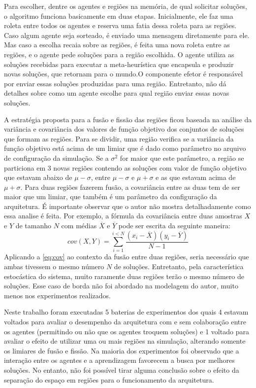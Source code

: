 Para escolher, dentre os agentes e regiões na memória, de qual solicitar soluções, o algoritmo funciona basicamente em duas etapas. Inicialmente, ele faz uma roleta entre todos os agentes e reserva uma fatia dessa roleta para as regiões. Caso algum agente seja sorteado, é enviado uma mensagem diretamente para ele. Mas caso a escolha recaia sobre as regiões, é feita uma nova roleta entre as regiões, e o agente pede soluções para a região escolhida. O agente utiliza as soluções recebidas para executar a meta-heurística que encapsula e produzir novas soluções, que retornam para o mundo.O componente efetor é responsável por enviar essas soluções produzidas para uma região. Entretanto,  não dá detalhes sobre como um agente escolhe para qual região enviar essas novas soluções. 

A estratégia proposta para a fusão e fissão das regiões ficou baseada na análise da variância e covariância dos valores de função objetivo dos conjuntos de soluções que formam as regiões. Para se dividir, uma região verifica se a variância da função objetivo está acima de um limiar que é dado como parâmetro no arquivo de configuração da simulação. Se a $\sigma^{2}$ for maior que este parâmetro, a  região se particiona em 3 novas regiões contendo as soluções com valor de função objetivo que estavam abaixo de $\mu - \sigma$, entre $\mu - \sigma$ e $\mu + \sigma$ e as que estavam acima de $\mu + \sigma$. Para duas regiões fazerem fusão, a covariância entre as duas tem de ser maior que um limiar, que também é um parâmetro da configuração da arquitetura. É importante observar que o autor não mostra detalhadamente como essa analise é feita. Por exemplo, a fórmula da covariância entre duas amostras $X$ e $Y$ de tamanho $N$ com médias $\overline{X}$ e $\overline{Y}$ pode ser escrita da seguinte maneira:
\begin{equation}
\label{eq:cov}
    cov(X,Y) = \sum_{i=1}^{i<N}\frac{(x_i - \overline{X})(y_i - \overline{Y})}{N - 1} 
\end{equation} 
Aplicando a \autoref{eq:cov} ao contexto da fusão entre duas regiões, seria necessário que ambas tivessem o mesmo número $N$ de soluções. Entretanto, pela característica estocástica do sistema, muito raramente duas regiões terão o mesmo número de soluções. Esse caso de borda não foi abordado na modelagem do autor, muito menos nos experimentos realizados. 

Neste trabalho foram executadas 5 baterias de experimentos dos quais 4 estavam voltados para avaliar o desempenho da arquitetura com e sem colaboração entre os agentes (permitindo ou não que os agentes troquem soluções) e 1 voltado para avaliar o efeito de utilizar uma ou mais regiões na simulação, alterando somente os limiares de fusão e fissão. Na maioria dos experimentos foi observado que a interação entre os agentes e a aprendizagem favorecem a busca por melhores soluções. No entanto, não foi possível tirar alguma conclusão sobre o efeito da separação do espaço em regiões para o funcionamento da arquitetura.


